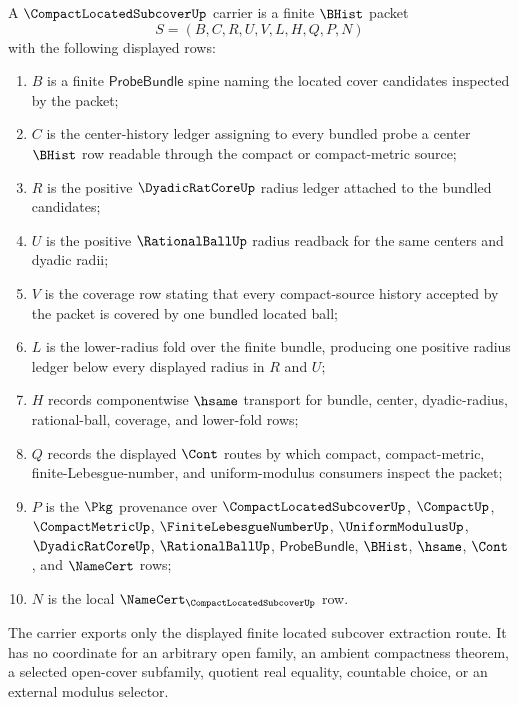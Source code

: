 \begin{definition}
\label{def:compact-located-subcover-carrier}
A $\CompactLocatedSubcoverUp$ carrier is a finite $\BHist$ packet
$$
S=(B,C,R,U,V,L,H,Q,P,N)
$$
with the following displayed rows:
\begin{enumerate}
\item $B$ is a finite $\mathsf{ProbeBundle}$ spine naming the located cover candidates inspected by the packet;
\item $C$ is the center-history ledger assigning to every bundled probe a center $\BHist$ row readable through the compact or compact-metric source;
\item $R$ is the positive $\DyadicRatCoreUp$ radius ledger attached to the bundled candidates;
\item $U$ is the positive $\RationalBallUp$ radius readback for the same centers and dyadic radii;
\item $V$ is the coverage row stating that every compact-source history accepted by the packet is covered by one bundled located ball;
\item $L$ is the lower-radius fold over the finite bundle, producing one positive radius ledger below every displayed radius in $R$ and $U$;
\item $H$ records componentwise $\hsame$ transport for bundle, center, dyadic-radius, rational-ball, coverage, and lower-fold rows;
\item $Q$ records the displayed $\Cont$ routes by which compact, compact-metric, finite-Lebesgue-number, and uniform-modulus consumers inspect the packet;
\item $P$ is the $\Pkg$ provenance over $\CompactLocatedSubcoverUp$, $\CompactUp$, $\CompactMetricUp$, $\FiniteLebesgueNumberUp$, $\UniformModulusUp$, $\DyadicRatCoreUp$, $\RationalBallUp$, $\mathsf{ProbeBundle}$, $\BHist$, $\hsame$, $\Cont$, and $\NameCert$ rows;
\item $N$ is the local $\NameCert_{\CompactLocatedSubcoverUp}$ row.
\end{enumerate}
The carrier exports only the displayed finite located subcover extraction route. It has no coordinate for an arbitrary open family, an ambient compactness theorem, a selected open-cover subfamily, quotient real equality, countable choice, or an external modulus selector.
\end{definition}

